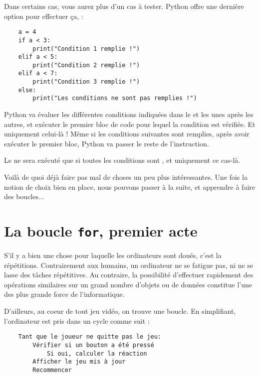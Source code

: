 Dans certains cas, vous aurez plus d'un cas à tester. Python offre une dernière option pour effectuer ça,  :

\begin{lstlisting}
    a = 4
    if a < 3:
        print("Condition 1 remplie !")
    elif a < 5:
        print("Condition 2 remplie !")
    elif a < 7:
        print("Condition 3 remplie !")
    else:
        print("Les conditions ne sont pas remplies !")
\end{lstlisting}

Python va évaluer les différentes conditions indiquées dans le  et  les unes après les autres, et exécuter le premier bloc de code pour lequel la condition est vérifiée. Et uniquement celui-là ! Même si les conditions suivantes sont remplies, après avoir exécuter le premier bloc, Python va passer le reste de l'instruction.

Le  ne sera exécuté que si toutes les conditions sont , et uniquement ce cas-là.

Voilà de quoi déjà faire pas mal de choses un peu plus intéressantes. Une fois la notion de choix bien en place, nous pouvons passer à la suite, et apprendre à faire des boucles...

\section{La boucle \texttt{for}, premier acte}

S'il y a bien une chose pour laquelle les ordinateurs sont doués, c'est la répétitions. Contrairement aux humains, un ordinateur ne se fatigue pas, ni ne se lasse des tâches répétitives. Au contraire, la possibilité d'effectuer rapidement des opérations similaires sur un grand nombre d'objets ou de données constitue l'une des plus grande force de l'informatique.

D'ailleurs, au coeur de tout jeu vidéo, on trouve une boucle. En simplifiant, l'ordinateur est pris dans un cycle comme suit :

\begin{lstlisting}
    Tant que le joueur ne quitte pas le jeu:
        Vérifier si un bouton a été pressé
            Si oui, calculer la réaction
        Afficher le jeu mis à jour
        Recommencer
\end{lstlisting}

